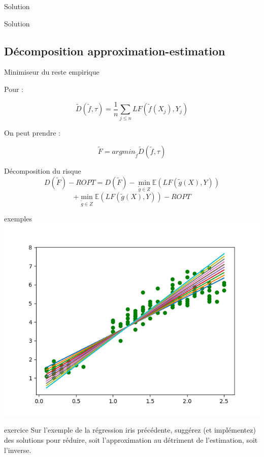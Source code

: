 \documentclass[11pt]{beamer}
\newcommand{\Pythonsmall}[1]{
	{\scriptsize }
}
\begin{document}
\begin{frame}{Solution}
\Pythonsmall{ext6}
\end{frame}

\begin{frame}{Solution}
\Pythonsmall{ext7}
\end{frame}

\subsection{Décomposition approximation-estimation}

\begin{frame}{Minimiseur du reste empirique}

Pour :

$$\tilde{D}(\tilde{f},\tau) = \frac{1}{n}\sum_{j \leq n} LF(\tilde{f}(X_j),Y_j)$$

On peut prendre :

$$\tilde{F} = argmin_{\tilde{f}} \tilde{D}(\tilde{f},\tau)$$

\end{frame}

\begin{frame}{Décomposition du risque}
$$D(\tilde{F}) - ROPT = D(\tilde{F}) - \min_{\tilde{g}\in Z}\mathbb{E}(LF(\tilde{g}(X),Y))$$
$$+\min_{\tilde{g}\in Z}\mathbb{E}(LF(\tilde{g}(X),Y)) - ROPT $$
\end{frame}

\begin{frame}{exemples}
 \includegraphics[scale=0.45]{ext9}
\end{frame}

\begin{frame}{exercice}
Sur l'exemple de la régression iris précédente, suggérez (et implémentez) des solutions pour réduire, soit l'approximation au détriment de l'estimation, soit l'inverse.
\end{frame}
\end{document}
